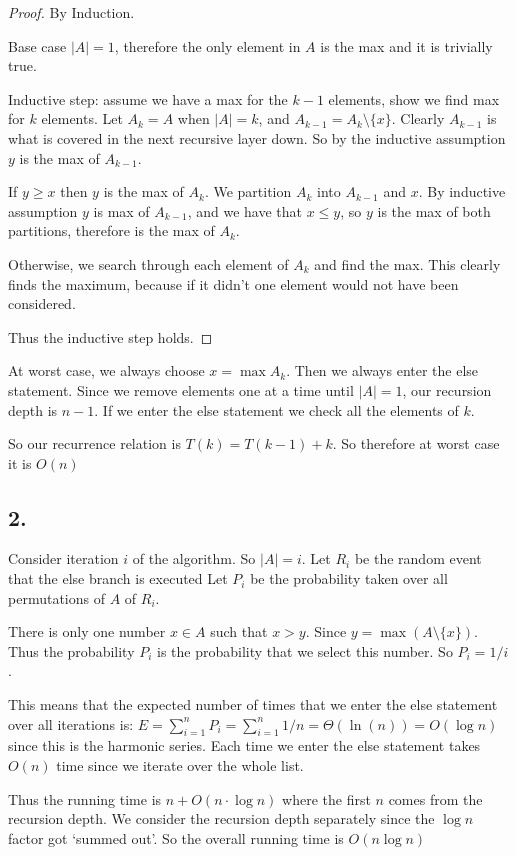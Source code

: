 \documentclass[11pt]{article}
\begin{document}
\begin{proof}
    By Induction.

    Base case $|A| = 1$, therefore the only element in $A$ is the max and it is trivially true.

    Inductive step: assume we have a max for the $k-1$ elements, show we find max for $k$ elements.
    Let $A_k = A$ when $|A| = k$, and $A_{k-1} = A_k \setminus \{x\}$.
    Clearly $A_{k-1}$ is what is covered in the next recursive layer down. 
    So by the inductive assumption $y$ is the max of $A_{k-1}$.

    If $y \geq x$ then $y$ is the max of $A_k$. We partition $A_k$ into $A_{k-1}$ and ${x}$.
    By inductive assumption $y$ is max of $A_{k-1}$, and we have that $x \leq y$, so $y$
    is the max of both partitions, therefore is the max of $A_k$.

    Otherwise, we search through each element of $A_k$ and find the max. This clearly
    finds the maximum, because if it didn't one element would not have been considered. 

    Thus the inductive step holds.
\end{proof}

At worst case, we always choose $x = \max A_k$. Then we always enter the else statement.
Since we remove elements one at a time until $|A| = 1$, our recursion depth is $n-1$.
If we enter the else statement we check all the elements of $k$.

So our recurrence relation is $T(k) = T(k-1) + k$. So therefore at worst case it is $O(n)$


\subsection*{2. }

Consider iteration $i$ of the algorithm. So $|A| = i$.
Let $R_i$ be the random event that the else branch is executed
Let $P_i$ be the probability taken over all permutations of $A$ of $R_i$.

There is only one number $x \in A$ such that $x > y$. Since $y = \max (A \setminus \{x\})$.
Thus the probability $P_i$ is the probability that we select this number. So $P_i = 1/i$.

This means that the expected number of times that we enter the else statement over all iterations is:
$E = \sum_{i = 1} ^n P_i = \sum_{i = 1} ^n 1/n = \Theta(\ln (n)) = O(\log n)$ since this is the harmonic series.
Each time we enter the else statement takes $O(n)$ time since we iterate over the whole list.

Thus the running time is $n + O(n \cdot \log n)$ where the first $n$ comes from the recursion depth.
We consider the recursion depth separately since the $\log n$ factor got `summed out'.
So the overall running time is $O(n \log n)$
\end{document}
